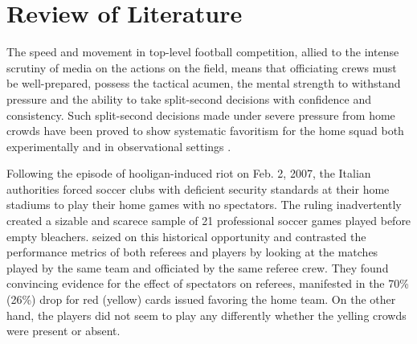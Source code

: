 \documentclass[]{interact}
\theoremstyle{plain}%
\theoremstyle{definition}
\theoremstyle{remark}
\begin{document}
\section{Review of Literature} 


The speed and movement in top-level football competition, allied to the intense scrutiny of media on the actions on the field, means that officiating crews must be well-prepared, possess the tactical acumen, the mental strength to withstand pressure and the ability to take split-second decisions with confidence and consistency. Such split-second decisions made under severe pressure from home crowds have been proved to show systematic favoritism for the home squad   
both experimentally \citep{Nevill1999, Nevill2002} and in observational settings \citep{Nevill1996, DOHMEN2008}.


Following the episode of hooligan-induced riot on Feb. 2, 2007, the Italian authorities forced soccer clubs with deficient security standards at their home stadiums to play their home games with no spectators. The ruling inadvertently created a sizable and scarece sample of 21 professional soccer games played before empty bleachers. \cite{Pettersson-Lidbom2010} seized on this historical opportunity and contrasted the performance metrics of both referees and players by looking at the matches played by the same team and officiated by the same referee crew. They found convincing evidence for the effect of spectators on referees, manifested in the 70\% (26\%) drop for red (yellow) cards issued favoring the home team. On the other hand, the players did not seem to play any differently whether the yelling crowds were present or absent. 
\end{document}
